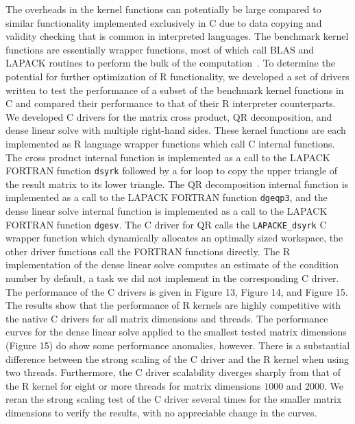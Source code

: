The overheads in the kernel functions can potentially be large compared to
  similar functionality implemented exclusively in C due to data copying and
  validity checking that is common in interpreted languages.
The benchmark kernel functions are essentially wrapper functions, most of which
  call BLAS and LAPACK routines to perform the bulk of the
  computation~\cite{cran:Rmanuals}.
To determine the potential for further optimization of R functionality, we
  developed a set of drivers written to test the performance of a subset of the
  benchmark kernel functions in C and compared their performance to that of
  their R interpreter counterparts.
We developed C drivers for the matrix cross product, QR decomposition, and
  dense linear solve with multiple right-hand sides.
These kernel functions are each implemented as R language wrapper functions
  which call C internal functions.
The cross product internal function is implemented as a call to the LAPACK
  FORTRAN function \texttt{dsyrk} followed by a for loop to copy the upper
  triangle of the result matrix to its lower triangle.
The QR decomposition internal function is implemented as a call to the LAPACK
  FORTRAN function \texttt{dgeqp3}, and the dense linear solve internal function
  is implemented as a call to the LAPACK FORTRAN function \texttt{dgesv}.
The C driver for QR calls the \texttt{LAPACKE\_dsyrk} C wrapper function which
  dynamically allocates an optimally sized workspace, the other driver functions
  call the FORTRAN functions directly.
The R implementation of the dense linear solve computes an estimate of the
  condition number by default, a task we did not implement in the corresponding
  C driver.
The performance of the C drivers is given in Figure 13, Figure 14, and
  Figure 15.
The results show that the performance of R kernels are highly competitive with
  the native C drivers for all matrix dimensions and threads.
The performance curves for the dense linear solve applied to the smallest tested
  matrix dimensions (Figure 15) do show some performance anomalies, however.
There is a substantial difference between the strong scaling of the C driver and
  the R kernel when using two threads.
Furthermore, the C driver scalability diverges sharply from that of the R kernel
  for eight or more threads for matrix dimensions $1000$ and $2000$.
We reran the strong scaling test of the C driver several times for the smaller
  matrix dimensions to verify the results, with no appreciable change in the
  curves.

